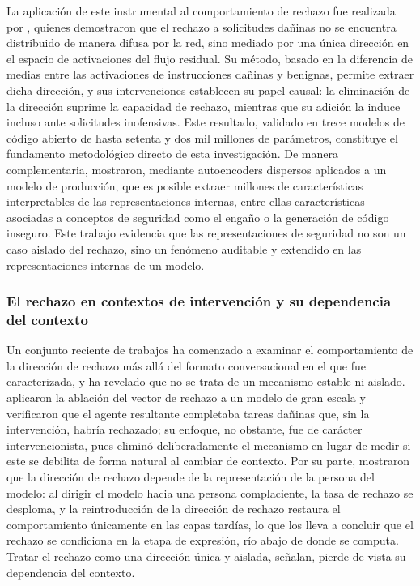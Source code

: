 \documentclass[12pt,a4paper]{article}
\newcommand{\textcite}[1]{\citet{#1}}
\begin{document}
\justifying

La aplicación de este instrumental al comportamiento de rechazo fue realizada por \textcite{arditi2024}, quienes demostraron que el rechazo a solicitudes dañinas no se encuentra distribuido de manera difusa por la red, sino mediado por una única dirección en el espacio de activaciones del flujo residual. Su método, basado en la diferencia de medias entre las activaciones de instrucciones dañinas y benignas, permite extraer dicha dirección, y sus intervenciones establecen su papel causal: la eliminación de la dirección suprime la capacidad de rechazo, mientras que su adición la induce incluso ante solicitudes inofensivas. Este resultado, validado en trece modelos de código abierto de hasta setenta y dos mil millones de parámetros, constituye el fundamento metodológico directo de esta investigación. De manera complementaria, \textcite{templeton2024} mostraron, mediante autoencoders dispersos aplicados a un modelo de producción, que es posible extraer millones de características interpretables de las representaciones internas, entre ellas características asociadas a conceptos de seguridad como el engaño o la generación de código inseguro. Este trabajo evidencia que las representaciones de seguridad no son un caso aislado del rechazo, sino un fenómeno auditable y extendido en las representaciones internas de un modelo.

\subsubsection*{El rechazo en contextos de intervención y su dependencia del contexto}

\justifying

Un conjunto reciente de trabajos ha comenzado a examinar el comportamiento de la dirección de rechazo más allá del formato conversacional en el que fue caracterizada, y ha revelado que no se trata de un mecanismo estable ni aislado. \textcite{lermen2024} aplicaron la ablación del vector de rechazo a un modelo de gran escala y verificaron que el agente resultante completaba tareas dañinas que, sin la intervención, habría rechazado; su enfoque, no obstante, fue de carácter intervencionista, pues eliminó deliberadamente el mecanismo en lugar de medir si este se debilita de forma natural al cambiar de contexto. Por su parte, \textcite{zhong2026} mostraron que la dirección de rechazo depende de la representación de la persona del modelo: al dirigir el modelo hacia una persona complaciente, la tasa de rechazo se desploma, y la reintroducción de la dirección de rechazo restaura el comportamiento únicamente en las capas tardías, lo que los lleva a concluir que el rechazo se condiciona en la etapa de expresión, río abajo de donde se computa. Tratar el rechazo como una dirección única y aislada, señalan, pierde de vista su dependencia del contexto.
\end{document}
